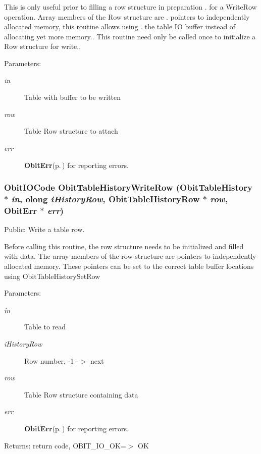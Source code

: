 This is only useful prior to filling a row structure in preparation . for a Write\-Row operation. Array members of the Row structure are . pointers to independently allocated memory, this routine allows using . the table IO buffer instead of allocating yet more memory.. This routine need only be called once to initialize a Row structure for write.. \begin{Desc}
\item[Parameters:]
\begin{description}
\item[{\em in}]Table with buffer to be written \item[{\em row}]Table Row structure to attach \item[{\em err}]{\bf Obit\-Err}{\rm (p.\,\pageref{structObitErr})} for reporting errors. \end{description}
\end{Desc}
\subsubsection{\setlength{\rightskip}{0pt plus 5cm}Obit\-IOCode Obit\-Table\-History\-Write\-Row ({\bf Obit\-Table\-History} $\ast$ {\em in}, {\bf olong} {\em i\-History\-Row}, {\bf Obit\-Table\-History\-Row} $\ast$ {\em row}, {\bf Obit\-Err} $\ast$ {\em err})}\label{ObitTableHistory_8c_a24}


Public: Write a table row. 

Before calling this routine, the row structure needs to be initialized and filled with data. The array members of the row structure are pointers to independently allocated memory. These pointers can be set to the correct table buffer locations using Obit\-Table\-History\-Set\-Row \begin{Desc}
\item[Parameters:]
\begin{description}
\item[{\em in}]Table to read \item[{\em i\-History\-Row}]Row number, -1 -$>$ next \item[{\em row}]Table Row structure containing data \item[{\em err}]{\bf Obit\-Err}{\rm (p.\,\pageref{structObitErr})} for reporting errors. \end{description}
\end{Desc}
\begin{Desc}
\item[Returns:]return code, OBIT\_\-IO\_\-OK=$>$ OK \end{Desc}
